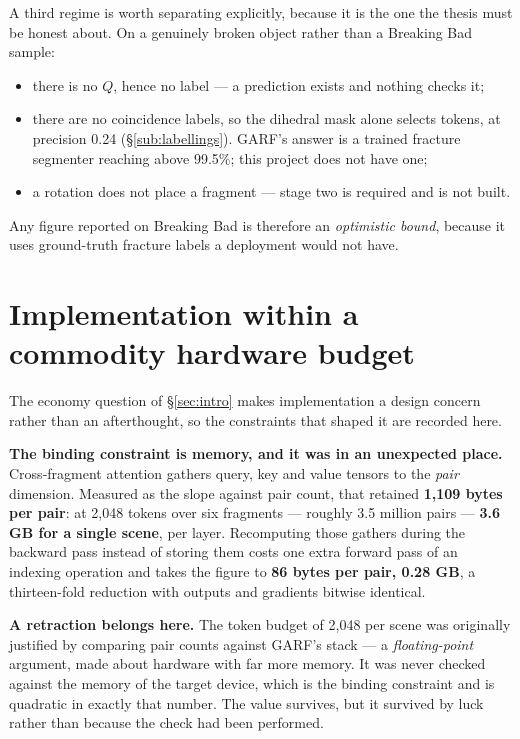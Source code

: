 \documentclass[11pt,a4paper]{report}
\newcommand{\measured}[1]{\textbf{#1}}
\begin{document}
A third regime is worth separating explicitly, because it is the one the thesis
must be honest about. On a genuinely broken object rather than a Breaking Bad
sample:

\begin{itemize}
\item there is no $Q$, hence no label --- a prediction exists and nothing checks it;
\item there are no coincidence labels, so the dihedral mask alone selects tokens,
      at precision 0.24 (\S\ref{sub:labellings}). GARF's answer is a trained fracture
      segmenter reaching above 99.5\%; this project does not have one;
\item a rotation does not place a fragment --- stage two is required and is not built.
\end{itemize}

Any figure reported on Breaking Bad is therefore an \emph{optimistic bound},
because it uses ground-truth fracture labels a deployment would not have.

\section{Implementation within a commodity hardware budget}
\label{sec:implementation}

The economy question of \S\ref{sec:intro} makes implementation a design concern rather than
an afterthought, so the constraints that shaped it are recorded here.

\textbf{The binding constraint is memory, and it was in an unexpected place.}
Cross-fragment attention gathers query, key and value tensors to the \emph{pair}
dimension. Measured as the slope against pair count, that retained
\measured{1{,}109 bytes per pair}: at 2{,}048 tokens over six fragments ---
roughly 3.5 million pairs --- \measured{3.6 GB for a single scene}, per layer.
Recomputing those gathers during the backward pass instead of storing them costs
one extra forward pass of an indexing operation and takes the figure to
\measured{86 bytes per pair, 0.28 GB}, a thirteen-fold reduction with outputs
and gradients bitwise identical.

\textbf{A retraction belongs here.} The token budget of 2{,}048 per scene was
originally justified by comparing pair counts against GARF's stack --- a
\emph{floating-point} argument, made about hardware with far more memory. It was
never checked against the memory of the target device, which is the binding
constraint and is quadratic in exactly that number. The value survives, but it
survived by luck rather than because the check had been performed.
\end{document}
